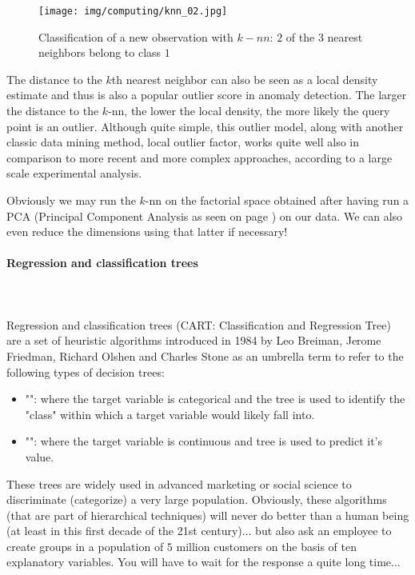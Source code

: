 	\begin{figure}[H]
		\centering
		\texttt{[image: img/computing/knn\_02.jpg]}
		\caption[]{Classification of a new observation with $k-nn$: $2$ of the $3$ nearest neighbors belong to class $1$}
	\end{figure}
	The distance to the $k$th nearest neighbor can also be seen as a local density estimate and thus is also a popular outlier score in anomaly detection. The larger the distance to the $k$-nn, the lower the local density, the more likely the query point is an outlier. Although quite simple, this outlier model, along with another classic data mining method, local outlier factor, works quite well also in comparison to more recent and more complex approaches, according to a large scale experimental analysis.
	
	\begin{tcolorbox}[title=Remark,colframe=black,arc=10pt]
	Obviously we may run the $k$-nn on the factorial space obtained after having run a PCA (Principal Component Analysis as seen on page \pageref{principal component analysis}) on our data. We can also even reduce the dimensions using that latter if necessary!
	\end{tcolorbox}
	
	\paragraph{Regression and classification trees}\mbox{}\\\\
	Regression and classification trees (CART: Classification and Regression Tree) are a set of heuristic algorithms  introduced in 1984 by Leo Breiman, Jerome Friedman, Richard Olshen and Charles Stone as an umbrella term to refer to the following types of decision trees: 
	\begin{itemize}
		\item "": where the target variable is categorical and the tree is used to identify the "class" within which a target variable would likely fall into.

		\item "": where the target variable is continuous and tree is used to predict it's value.
	\end{itemize}
	These trees are widely used in advanced marketing or social science to discriminate (categorize) a very large population. Obviously, these algorithms (that are part of hierarchical techniques) will never do better than a human being (at least in this first decade of the 21st century)... but also ask an employee to create groups in a population of $5$ million customers on the basis of ten explanatory variables. You will have to wait for the response a quite long time...
	
